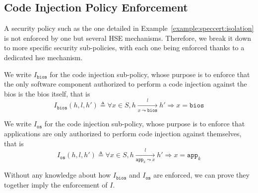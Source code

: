 \subsection{Code Injection Policy Enforcement}
\label{subsec:speccert:isolationenforcement}

A security policy such as the one detailed in
Example~\ref{example:speccert:isolation} is not enforced by one but several HSE
mechanisms.
%
Therefore, we break it down to more specific security sub-policies, with each
one being enforced thanks to a dedicated \ac{hse} mechanism.

\begin{definition}
  \label{def:speccert:biospol}

  We write $I_{\mathtt{bios}}$ for the code injection sub-policy, whose purpose
  is to enforce that the only software component authorized to perform a code
  injection against the \ac{bios} is the \ac{bios} itself, that is
  \[
    I_{\mathtt{bios}}(h, l, h') \triangleq \forall x \in S, h \xrightarrow[x
    \leadsto \mathtt{bios}]{l} h' \Rightarrow x = \mathtt{bios}
  \]
\end{definition}

\begin{definition}
  \label{def:speccert:biospol}

  We write $I_{\mathtt{os}}$ for the code injection sub-policy, whose purpose is
  to enforce that applications are only authorized to perform code injection
  against themselves, that is
  \[
    I_\mathtt{os}(h, l, h') \triangleq \forall x \in S, h
    \xrightarrow[\mathtt{app}_k \leadsto x]{l} h' \Rightarrow x = \mathtt{app}_k
  \]
\end{definition}

Without any knowledge about how \( I_{\mathtt{bios}} \) and
\( I_{\mathtt{os}} \) are enforced, we can prove they together imply the
enforcement of \( I \).

